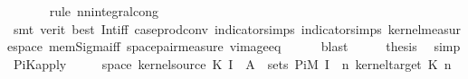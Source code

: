 \begin{isabellebody}
\ \ \ \ \ \isamarkupfalse%
\ {\isacharparenleft}{\kern0pt}rule\ nn{\isacharunderscore}{\kern0pt}integral{\isacharunderscore}{\kern0pt}cong{\isacharparenright}{\kern0pt}\isanewline
\ \ \ \ \ \isamarkupfalse%
\ {\isacharparenleft}{\kern0pt}smt\ {\isacharparenleft}{\kern0pt}verit{\isacharcomma}{\kern0pt}\ best{\isacharparenright}{\kern0pt}\ Int{\isacharunderscore}{\kern0pt}iff\ case{\isacharunderscore}{\kern0pt}prod{\isacharunderscore}{\kern0pt}conv\ indicator{\isacharunderscore}{\kern0pt}simps{\isacharparenleft}{\kern0pt}{}{\isacharparenright}{\kern0pt}\ indicator{\isacharunderscore}{\kern0pt}simps{\isacharparenleft}{\kern0pt}{}{\isacharparenright}{\kern0pt}\ kernel{\isacharunderscore}{\kern0pt}measure{\isacharunderscore}{\kern0pt}space\ mem{\isacharunderscore}{\kern0pt}Sigma{\isacharunderscore}{\kern0pt}iff\ space{\isacharunderscore}{\kern0pt}pair{\isacharunderscore}{\kern0pt}measure\ vimage{\isacharunderscore}{\kern0pt}eq{\isacharparenright}{\kern0pt}\isanewline
\ \ \ \ \isamarkupfalse%
\ blast\isanewline
\ \ \isamarkupfalse%
\ \isamarkupfalse%
\ {\isacharquery}{\kern0pt}thesis\ \isamarkupfalse%
\ simp\isanewline
{}\isamarkupfalse%
%
\endisatagproof
{\isafoldproof}%
%
\isadelimproof
\isanewline
%
\endisadelimproof
\isanewline
{}\isamarkupfalse%
\ PiK{\isacharunderscore}{\kern0pt}apply{\isacharunderscore}{\kern0pt}{}{\isacharcolon}{\kern0pt}\isanewline
\ \ \ {\isachardoublequoteopen}{\isasymomega}\ {\isasymin}\ space\ {\isacharparenleft}{\kern0pt}kernel{\isacharunderscore}{\kern0pt}source\ {\isacharparenleft}{\kern0pt}K\ {\isacharparenleft}{\kern0pt}I\ {}{\isacharparenright}{\kern0pt}{\isacharparenright}{\kern0pt}{\isacharparenright}{\kern0pt}{\isachardoublequoteclose}\ {\isachardoublequoteopen}A{\isacharprime}{\kern0pt}\ {\isasymin}\ sets\ {\isacharparenleft}{\kern0pt}PiM\ {\isacharbraceleft}{\kern0pt}I\ {}{\isacharbraceright}{\kern0pt}\ {\isacharparenleft}{\kern0pt}{\isasymlambda}n{\isachardot}{\kern0pt}\ kernel{\isacharunderscore}{\kern0pt}target\ {\isacharparenleft}{\kern0pt}K\ n{\isacharparenright}{\kern0pt}{\isacharparenright}{\kern0pt}{\isacharparenright}{\kern0pt}{\isachardoublequoteclose}\isanewline

\end{isabellebody}
